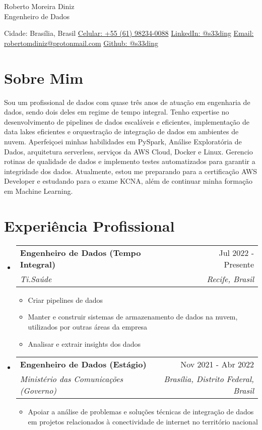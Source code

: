 \documentclass[letterpaper,11pt]{article}%
\makeatletter
\newcommand{\resumeItem}[1]{\item{#1 \vspace{-3pt}}}%
\newcommand{\resumeSubheading}[4]{\vspace{-1pt}\item\begin{tabular*}{0.97\textwidth}[t]{l@{\extracolsep{\fill}}r}\textbf{#1} & #2 \\\textit{\small #3} & \textit{\small #4} \\\end{tabular*}\vspace{-8pt}}%
\newcommand{\resumeSubHeadingListStart}{\begin{itemize}[leftmargin=0.15in, label={}, itemsep=0pt, parsep=0pt]}%
\newcommand{\resumeSubHeadingListEnd}{\end{itemize}}%
\newcommand{\resumeItemListStart}{\begin{itemize}[itemsep=0pt, parsep=0pt]}%
\newcommand{\resumeItemListEnd}{\end{itemize}\vspace{-1pt}}%
\makeatother
\begin{document}
%
\normalsize%
\section*{}%
\label{sec:}%
\begin{center}%
{\LARGE Roberto Moreira Diniz} \\ \vspace{5pt}%
{\large Engenheiro de Dados} \\ \vspace{5pt}%
\end{center}%
\begin{center}%
\small%
Cidade: Brasília, Brasil \quad \textbullet \quad \href{https://wa.me/qr/UYOUX2DZ7BYHI1}{Celular: +55 (61) 98234-0088} \quad \textbullet \quad \href{https://www.linkedin.com/in/s33ding/}{LinkedIn: @s33ding} \quad \textbullet \quad \href{mailto:robertomdiniz@protonmail.com}{Email: robertomdiniz@protonmail.com} \quad \textbullet \quad \href{https://github.com/s33ding}{Github: @s33ding}%
\normalsize%
\end{center}

%
\section*{Sobre Mim}%
\label{sec:SobreMim}%
Sou um profissional de dados com quase três anos de atuação em engenharia de dados, sendo dois deles em regime de tempo integral. Tenho expertise no desenvolvimento de pipelines de dados escaláveis e eficientes, implementação de data lakes eficientes e orquestração de integração de dados em ambientes de nuvem. Aperfeiçoei minhas habilidades em PySpark, Análise Exploratória de Dados, arquitetura serverless, serviços da AWS Cloud, Docker e Linux. Gerencio rotinas de qualidade de dados e implemento testes automatizados para garantir a integridade dos dados. Atualmente, estou me preparando para a certificação AWS Developer e estudando para o exame KCNA, além de continuar minha formação em Machine Learning.

%
\section*{Experiência Profissional}%
\label{sec:ExperinciaProfissional}%
\resumeSubHeadingListStart%
\resumeSubheading{Engenheiro de Dados (Tempo Integral)}{Jul 2022 - Presente}{Ti.Saúde}{Recife, Brasil}%
\resumeItemListStart%
\resumeItem{Criar pipelines de dados}%
\resumeItem{Manter e construir sistemas de armazenamento de dados na nuvem, utilizados por outras áreas da empresa}%
\resumeItem{Analisar e extrair insights dos dados}%
\resumeItemListEnd%
\resumeSubheading{Engenheiro de Dados (Estágio)}{Nov 2021 - Abr 2022}{Ministério das Comunicações (Governo)}{Brasília, Distrito Federal, Brasil}%
\resumeItemListStart%
\resumeItem{Apoiar a análise de problemas e soluções técnicas de integração de dados em projetos relacionados à conectividade de internet no território nacional}%
\resumeItemListEnd%
\resumeSubHeadingListEnd
\end{document}
